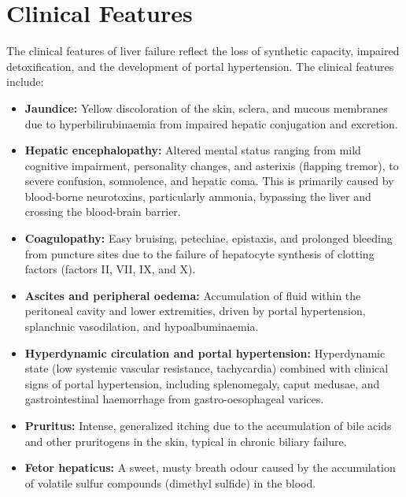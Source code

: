 \section*{Clinical Features}
The clinical features of liver failure reflect the loss of synthetic capacity, impaired detoxification, and the development of portal hypertension. The clinical features include:
\begin{itemize}
    \item \textbf{Jaundice:} Yellow discoloration of the skin, sclera, and mucous membranes due to hyperbilirubinaemia from impaired hepatic conjugation and excretion.
    \item \textbf{Hepatic encephalopathy:} Altered mental status ranging from mild cognitive impairment, personality changes, and asterixis (flapping tremor), to severe confusion, somnolence, and hepatic coma. This is primarily caused by blood-borne neurotoxins, particularly ammonia, bypassing the liver and crossing the blood-brain barrier.
    \item \textbf{Coagulopathy:} Easy bruising, petechiae, epistaxis, and prolonged bleeding from puncture sites due to the failure of hepatocyte synthesis of clotting factors (factors II, VII, IX, and X).
    \item \textbf{Ascites and peripheral oedema:} Accumulation of fluid within the peritoneal cavity and lower extremities, driven by portal hypertension, splanchnic vasodilation, and hypoalbuminaemia.
    \item \textbf{Hyperdynamic circulation and portal hypertension:} Hyperdynamic state (low systemic vascular resistance, tachycardia) combined with clinical signs of portal hypertension, including splenomegaly, caput medusae, and gastrointestinal haemorrhage from gastro-oesophageal varices.
    \item \textbf{Pruritus:} Intense, generalized itching due to the accumulation of bile acids and other pruritogens in the skin, typical in chronic biliary failure.
    \item \textbf{Fetor hepaticus:} A sweet, musty breath odour caused by the accumulation of volatile sulfur compounds (dimethyl sulfide) in the blood.
\end{itemize}

